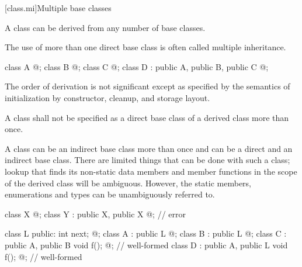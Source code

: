 [class.mi]{Multiple base classes}
%
%

\pnum
A class can be derived from any number of base classes.
\begin{note}
The use of more than one direct base class is often called multiple inheritance.
\end{note}
\begin{example}
\begin{codeblock}
class A { @\commentellip@ };
class B { @\commentellip@ };
class C { @\commentellip@ };
class D : public A, public B, public C { @\commentellip@ };
\end{codeblock}
\end{example}

\pnum
{}%
%
\begin{note}
The order of derivation is not significant except as specified by the
semantics of initialization by constructor,
cleanup, and storage
layout.
\end{note}

\pnum
A class shall not be specified as a direct base class of a derived class
more than once.
\begin{note}
A class can be an indirect base class more than once and can be a direct
and an indirect base class. There are limited things that can be done
with such a class;
lookup that finds its non-static data members and member functions
in the scope of the derived class will be ambiguous.
However, the static members, enumerations and types can be
unambiguously referred to.
\end{note}
\begin{example}
\begin{codeblock}
class X { @\commentellip@ };
class Y : public X, public X { @\commentellip@ };             // error

\end{codeblock}
\begin{codeblock}
class L { public: int next;  @\commentellip@ };
class A : public L { @\commentellip@ };
class B : public L { @\commentellip@ };
class C : public A, public B { void f(); @\commentellip@ };   // well-formed
class D : public A, public L { void f(); @\commentellip@ };   // well-formed
\end{codeblock}
\end{example}

